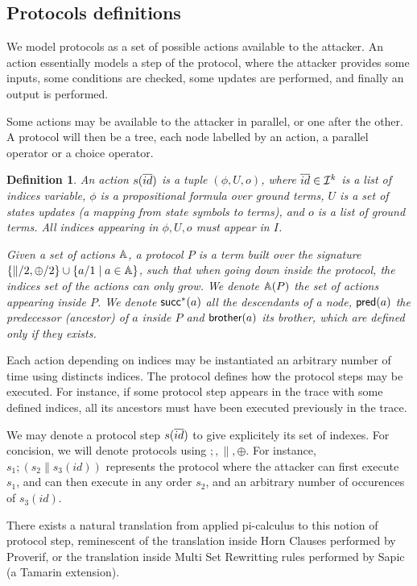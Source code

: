\documentclass[a4paper]{article}
\newtheorem{definition}{Definition}
\theoremstyle{remark}
\begin{document}
\subsection{Protocols definitions}
We  model protocols as a set of possible actions available to the
attacker. An action essentially models a step of the protocol, where
the attacker provides some inputs, some conditions are checked, some
updates are performed, and finally an output is performed.

Some actions may be available to the attacker in parallel, or one
after the other. A protocol will then be a tree, each node labelled by an action, a parallel operator or a choice operator.

\begin{definition}
An action $s(\overline{id})$ is a tuple $(\phi,U,o)$, where $\overline{id} \in \mathcal{I}^k$ is a list of indices variable, $\phi$ is a propositional formula over ground terms, $U$ is a set of states updates (a mapping from state symbols to terms), and $o$ is a list of ground terms.
All indices appearing in $\phi,U,o$ must appear in $I$.

Given a set of actions $\mathbb{A}$, a protocol $P$ is a term built over the signature $\{\|/2,\oplus/2\} \cup \{a/1 \mid a \in \mathbb{A}\}$, such that when going down inside the protocol, the indices set of the actions can only grow. We denote $\mathbb{A}(P)$ the set of actions appearing inside $P$. We denote $\textsf{succ}^*(a)$ all the descendants of a node, $\textsf{pred}(a)$ the predecessor (ancestor) of $a$ inside $P$ and $\textsf{brother}(a)$ its brother, which are defined only if they exists.
\end{definition}

Each action depending on indices may be instantiated an arbitrary number of time using distincts indices. The protocol defines how the protocol steps may be executed. For instance, if some protocol step appears in
the trace with some defined indices, all its ancestors must have been executed previously in the trace.

We may denote a protocol step $s(\overline{id})$ to give explicitely its set of indexes.
For concision, we will denote protocols using $;,\|,\oplus$. For instance, $s_1; (s_2 \| s_3(id))$ represents the protocol where the attacker can first execute $s_1$, and can then execute in any order $s_2$, and an arbitrary number of occurences of $s_3(id)$.

There exists a natural translation from applied pi-calculus to this notion of protocol step, reminescent of the translation inside Horn Clauses performed by Proverif, or the translation inside Multi Set Rewritting rules performed by Sapic (a Tamarin extension).
\end{document}
